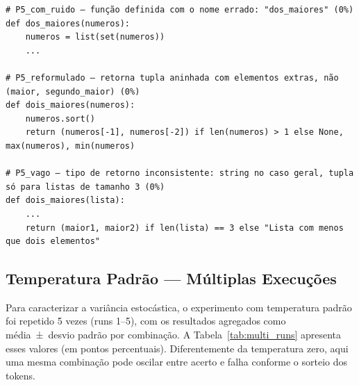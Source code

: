 \documentclass[12pt,
    english,
    french,
    spanish,
    brazil,
    ]{article}
\begin{document}
\begin{lstlisting}[style=python, caption={Falhas de deepseek-coder em P5 com temperatura zero}]
# P5_com_ruido — função definida com o nome errado: "dos_maiores" (0%)
def dos_maiores(numeros):
    numeros = list(set(numeros))
    ...

# P5_reformulado — retorna tupla aninhada com elementos extras, não (maior, segundo_maior) (0%)
def dois_maiores(numeros):
    numeros.sort()
    return (numeros[-1], numeros[-2]) if len(numeros) > 1 else None, max(numeros), min(numeros)

# P5_vago — tipo de retorno inconsistente: string no caso geral, tupla só para listas de tamanho 3 (0%)
def dois_maiores(lista):
    ...
    return (maior1, maior2) if len(lista) == 3 else "Lista com menos que dois elementos"
\end{lstlisting}

\subsection{Temperatura Padrão — Múltiplas Execuções}

Para caracterizar a variância estocástica, o experimento com temperatura padrão foi repetido 5 vezes (runs 1–5), com os resultados agregados como média~±~desvio padrão por combinação. A Tabela~\ref{tab:multi_runs} apresenta esses valores (em pontos percentuais). Diferentemente da temperatura zero, aqui uma mesma combinação pode oscilar entre acerto e falha conforme o sorteio dos tokens.
\end{document}
